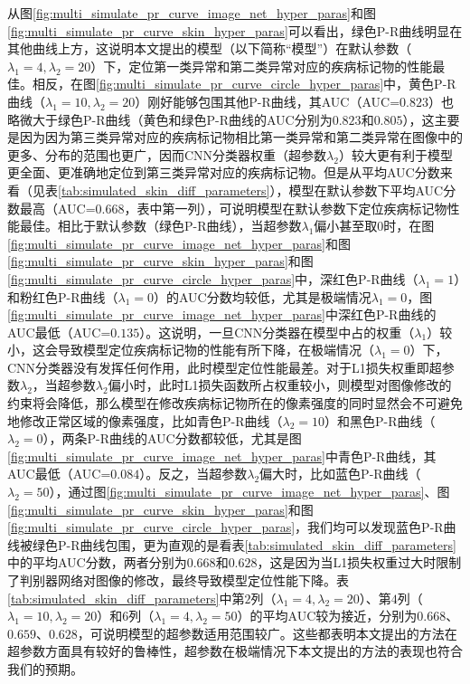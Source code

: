 从图\ref{fig:multi_simulate_pr_curve_image_net_hyper_paras}和图\ref{fig:multi_simulate_pr_curve_skin_hyper_paras}可以看出，绿色P-R曲线明显在其他曲线上方，这说明本文提出的模型（以下简称“模型”）在默认参数（$\lambda_{1}=4,\lambda_{2}=20$）下，定位第一类异常和第二类异常对应的疾病标记物的性能最佳。相反，在图\ref{fig:multi_simulate_pr_curve_circle_hyper_paras}中，黄色P-R曲线（$\lambda_{1}=10,\lambda_{2}=20$）刚好能够包围其他P-R曲线，其AUC（AUC=$0.823$）也略微大于绿色P-R曲线（黄色和绿色P-R曲线的AUC分别为$0.823$和$0.805$），这主要是因为因为第三类异常对应的疾病标记物相比第一类异常和第二类异常在图像中的更多、分布的范围也更广，因而CNN分类器权重（超参数$\lambda_{2}$）较大更有利于模型更全面、更准确地定位到第三类异常对应的疾病标记物。但是从平均AUC分数来看（见表\ref{tab:simulated_skin_diff_parameters}），模型在默认参数下平均AUC分数最高（AUC=$0.668$，表中第一列），可说明模型在默认参数下定位疾病标记物性能最佳。相比于默认参数（绿色P-R曲线），当超参数$\lambda_{1}$偏小甚至取$0$时，在图\ref{fig:multi_simulate_pr_curve_image_net_hyper_paras}和图\ref{fig:multi_simulate_pr_curve_skin_hyper_paras}和图\ref{fig:multi_simulate_pr_curve_circle_hyper_paras}中，深红色P-R曲线（$\lambda_{1}=1$）和粉红色P-R曲线（$\lambda_{1}=0$）的AUC分数均较低，尤其是极端情况$\lambda_{1}=0$，图\ref{fig:multi_simulate_pr_curve_image_net_hyper_paras}中深红色P-R曲线的AUC最低（AUC=$0.135$）。这说明，一旦CNN分类器在模型中占的权重（$\lambda_{1}$）较小，这会导致模型定位疾病标记物的性能有所下降，在极端情况（$\lambda_{1}=0$）下，CNN分类器没有发挥任何作用，此时模型定位性能最差。对于L1损失权重即超参数$\lambda_{2}$，当超参数$\lambda_{2}$偏小时，此时L1损失函数所占权重较小，则模型对图像修改的约束将会降低，那么模型在修改疾病标记物所在的像素强度的同时显然会不可避免地修改正常区域的像素强度，比如青色P-R曲线（$\lambda_{2}=10$）和黑色P-R曲线（$\lambda_2=0$），两条P-R曲线的AUC分数都较低，尤其是图\ref{fig:multi_simulate_pr_curve_image_net_hyper_paras}中青色P-R曲线，其AUC最低（AUC=$0.084$）。反之，当超参数$\lambda_{2}$偏大时，比如蓝色P-R曲线（$\lambda_{2}=50$），通过图\ref{fig:multi_simulate_pr_curve_image_net_hyper_paras}、图\ref{fig:multi_simulate_pr_curve_skin_hyper_paras}和图\ref{fig:multi_simulate_pr_curve_circle_hyper_paras}，我们均可以发现蓝色P-R曲线被绿色P-R曲线包围，更为直观的是看表\ref{tab:simulated_skin_diff_parameters}中的平均AUC分数，两者分别为$0.668$和$0.628$，这是因为当L1损失权重过大时限制了判别器网络对图像的修改，最终导致模型定位性能下降。表\ref{tab:simulated_skin_diff_parameters}中第$2$列（$\lambda_{1}=4,\lambda_{2}=20$）、第$4$列（$\lambda_{1}=10,\lambda_{2}=20$）和$6$列（$\lambda_{1}=4,\lambda_{2}=50$）的平均AUC较为接近，分别为$0.668$、$0.659$、$0.628$，可说明模型的超参数适用范围较广。这些都表明本文提出的方法在超参数方面具有较好的鲁棒性，超参数在极端情况下本文提出的方法的表现也符合我们的预期。
